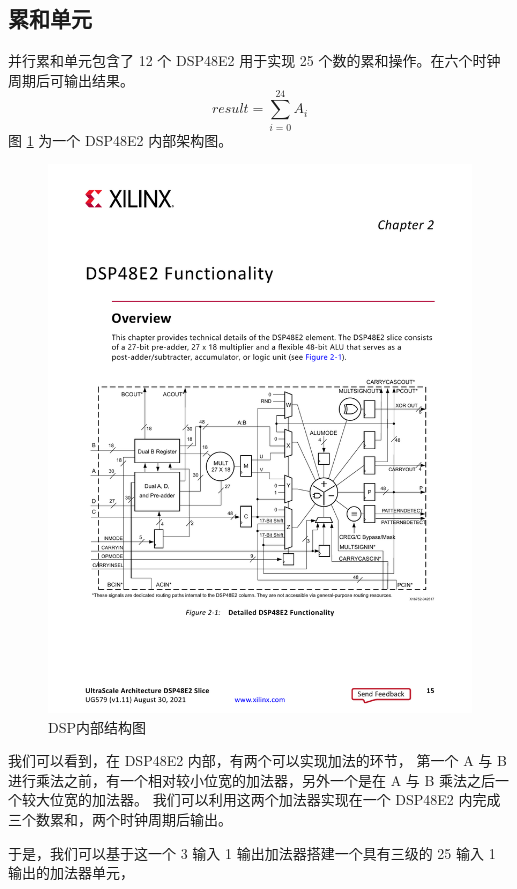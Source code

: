 \documentclass[12pt, a4paper, oneside]{ctexbook}
\begin{document}
	\subsection{累和单元}
	并行累和单元包含了 12 个 DSP48E2 用于实现 25 个数的累和操作。在六个时钟周期后可输出结果。
	\begin{equation} \label{sum}
		result = \sum_{i=0}^{24}A_i
	\end{equation}
	图 \ref{DSP} 为一个 DSP48E2 内部架构图。
		\begin{figure}[h]
		\centering
		\includegraphics[scale=0.87]{pic/DSP}
		\caption{DSP内部结构图}
		\label{DSP}
		\end{figure}
	\par 我们可以看到，在 DSP48E2 内部，有两个可以实现加法的环节，
	第一个 A 与 B 进行乘法之前，有一个相对较小位宽的加法器，另外一个是在 A 与 B 乘法之后一个较大位宽的加法器。
	我们可以利用这两个加法器实现在一个 DSP48E2 内完成三个数累和，两个时钟周期后输出。
	\par 于是，我们可以基于这一个 3 输入 1 输出加法器搭建一个具有三级的 25 输入 1 输出的加法器单元，
\end{document}
